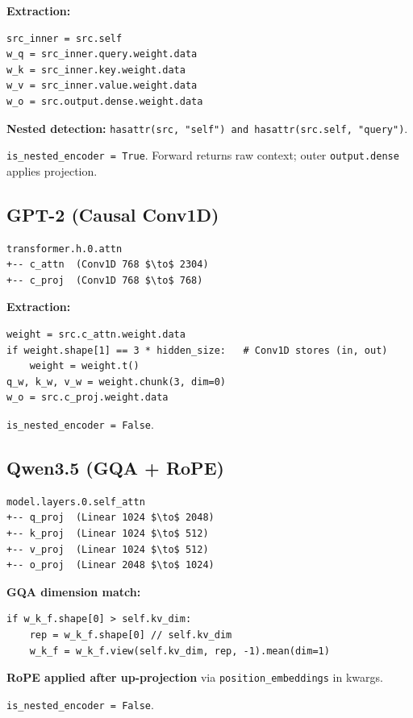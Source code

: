 \textbf{Extraction:}
\begin{lstlisting}
src_inner = src.self
w_q = src_inner.query.weight.data
w_k = src_inner.key.weight.data
w_v = src_inner.value.weight.data
w_o = src.output.dense.weight.data
\end{lstlisting}

\textbf{Nested detection:} \texttt{hasattr(src, "self") and hasattr(src.self, "query")}.

\texttt{is\_nested\_encoder = True}. Forward returns raw context; outer 
\texttt{output.dense} applies projection.

\subsection{GPT-2 (Causal Conv1D)}

\begin{lstlisting}
transformer.h.0.attn
+-- c_attn  (Conv1D 768 $\to$ 2304)
+-- c_proj  (Conv1D 768 $\to$ 768)
\end{lstlisting}

\textbf{Extraction:}
\begin{lstlisting}
weight = src.c_attn.weight.data
if weight.shape[1] == 3 * hidden_size:   # Conv1D stores (in, out)
    weight = weight.t()
q_w, k_w, v_w = weight.chunk(3, dim=0)
w_o = src.c_proj.weight.data
\end{lstlisting}

\texttt{is\_nested\_encoder = False}.

\subsection{Qwen3.5 (GQA + RoPE)}

\begin{lstlisting}
model.layers.0.self_attn
+-- q_proj  (Linear 1024 $\to$ 2048)
+-- k_proj  (Linear 1024 $\to$ 512)
+-- v_proj  (Linear 1024 $\to$ 512)
+-- o_proj  (Linear 2048 $\to$ 1024)
\end{lstlisting}

\textbf{GQA dimension match:}
\begin{lstlisting}
if w_k_f.shape[0] > self.kv_dim:
    rep = w_k_f.shape[0] // self.kv_dim
    w_k_f = w_k_f.view(self.kv_dim, rep, -1).mean(dim=1)
\end{lstlisting}

\textbf{RoPE applied after up-projection} via \texttt{position\_embeddings} in kwargs.

\texttt{is\_nested\_encoder = False}.

